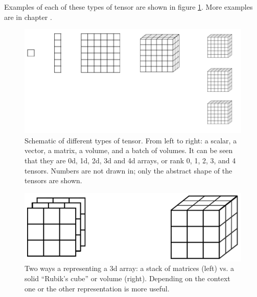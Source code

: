 
Examples of each of these types of tensor are shown in figure \ref{tensorTypes}. More examples are in chapter .

\begin{figure}[h]
\centering
\includegraphics[scale=0.6]{./images/tensorTypes.png}
\caption[Soraya Boza.]{Schematic of different types of tensor. From left to right: a scalar, a vector, a matrix, a volume, and a batch of volumes. It can be seen that they are 0d, 1d, 2d, 3d and 4d arrays, or rank 0, 1, 2, 3, and 4 tensors. Numbers are not drawn in; only the abstract shape of the tensors are shown.} 
\label{tensorTypes}
\end{figure}

\begin{figure}[h]
\centering
\includegraphics[scale=0.3]{./images/tensorVisualStyles.png}
\caption[Soraya Boza.]{Two ways a representing a 3d array: a stack of matrices (left) vs. a solid ``Rubik's cube''  or volume (right). Depending on the context one or the other representation is more useful.} 
\label{tensorVisualStyles}
\end{figure}

